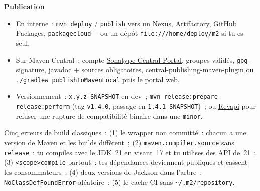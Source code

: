 \documentclass[12pt,a4paper,twoside,openright]{book}
\newcommand{\link}[2]{\href{#2}{#1}}
\newcommand{\etape}[1]{\par\medskip\noindent\textbf{\large #1}\par\smallskip}
\begin{document}

\etape{Publication}
\begin{itemize}
  \item En interne~: \verb|mvn deploy| / \verb|publish| vers un Nexus, Artifactory, GitHub Packages,
        \verb|packagecloud|--- ou un d\'ep\^ot \verb|file:///home/deploy/m2| si tu es seul.
  \item Sur Maven Central~: compte \link{Sonatype Central Portal}{https://central.sonatype.com/},
        groupes valid\'es, \verb|gpg|-signature, javadoc + sources obligatoires,
        \link{central-publishing-maven-plugin}{https://github.com/central-publishing/central-publishing-maven-plugin}
        ou \verb|./gradlew publishToMavenLocal| puis le portal web.
  \item Versionnement~: \verb|x.y.z-SNAPSHOT| en dev~; \verb|mvn release:prepare release:perform|
        (tag \verb|v1.4.0|, passage en \verb|1.4.1-SNAPSHOT|)~; ou \link{Revapi}{https://github.com/revapi/revapi}
        pour refuser une rupture de compatibilit\'e binaire dans une \verb|minor|.
\end{itemize}

\begin{piege}
Cinq erreurs de build classiques~: (1) le wrapper non committ\'e~: chacun a une version de Maven et
les builds diff\`erent~; (2) \verb|maven.compiler.source| sans \verb|release|~: tu compiles avec le
JDK~21 en visant~17 et tu utilises des API de~21~; (3) \verb|<scope>compile| partout~: tes
d\'ependances deviennent publiques et cassent les consommateurs~; (4) deux versions de Jackson
dans l'arbre~: \verb|NoClassDefFoundError| al\'eatoire~; (5) le cache CI sans \verb|~/.m2/repository|.
\end{piege}
\end{document}
